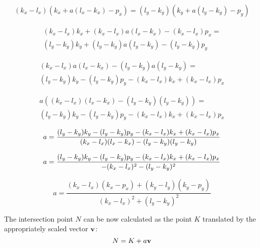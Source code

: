 \documentclass[a4paper,12pt]{article}
\begin{document}
\begin{equation*}
\begin{multlined}
(k_x - l_x) (k_x + a (l_x - k_x) - p_x) =
(l_y - k_y) (k_y + a (l_y - k_y) - p_y)
\end{multlined}
\end{equation*}

\begin{equation*}
\begin{multlined}
(k_x - l_x) k_x + (k_x - l_x) a (l_x - k_x) - (k_x - l_x) p_x =\\
(l_y - k_y) k_y + (l_y - k_y) a (l_y - k_y) - (l_y - k_y) p_y
\end{multlined}
\end{equation*}

\begin{equation*}
\begin{multlined}
(k_x - l_x) a (l_x - k_x) - (l_y - k_y) a (l_y - k_y) =\\
(l_y - k_y) k_y - (l_y - k_y) p_y - (k_x - l_x) k_x + (k_x - l_x) p_x
\end{multlined}
\end{equation*}

\begin{equation*}
\begin{multlined}
a ((k_x - l_x) (l_x - k_x) - (l_y - k_y) (l_y - k_y)) =\\
(l_y - k_y) k_y - (l_y - k_y) p_y - (k_x - l_x) k_x + (k_x - l_x) p_x
\end{multlined}
\end{equation*}

\begin{equation*}
  a = \frac{(l_y - k_y)k_y - (l_y - k_y)p_y - (k_x - l_x)k_x + (k_x - l_x)p_x}{(k_x - l_x)(l_x - k_x) - (l_y - k_y)(l_y - k_y)}\\
\end{equation*}

\begin{equation*}
  a = \frac{(l_y - k_y)k_y - (l_y - k_y)p_y - (k_x - l_x)k_x + (k_x - l_x)p_x}{- (k_x - l_x)^2 - (l_y - k_y)^2}\\
\end{equation*}

\begin{equation}
  a = \frac{(k_x - l_x)(k_x - p_x) + (k_y - l_y)(k_y - p_y)}{(k_x - l_x)^2 + (l_y - k_y)^2}\label{eq:a_coefficient}
\end{equation}

The intersection point \(N\) can be now calculated as the point \(K\)
translated by the appropriately scaled vector \(\vb{v}\):
\begin{equation}
N = K + a\vb{v}\label{eq:intersection_point}
\end{equation}
\end{document}
